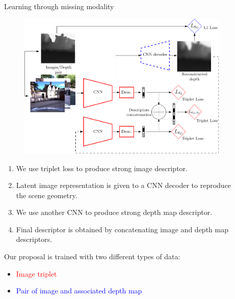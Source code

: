 \documentclass[final]{beamer}
\newlength{\sepwidth}
\newlength{\colwidth}
\newcommand{\separatorcolumn}{\begin{column}{\sepwidth}\end{column}}
\begin{document}
\begin{frame}[t]
\begin{columns}[t]
\begin{column}{\colwidth}
\end{column}

\separatorcolumn

\begin{column}{\colwidth}  

  \begin{block}{Learning through missing modality}
    \begin{figure}
		\centering
		\includegraphics[width=\linewidth]{vect/method/fig3/final_color}	    
    \end{figure}
    
    \begin{enumerate}
      \item We use triplet loss to produce strong image descriptor.
      \item Latent image representation is given to a CNN decoder to reproduce the scene geometry.
      \item We use another CNN to produce strong depth map descriptor.
      \item Final descriptor is obtained by concatenating image and depth map descriptors.
    \end{enumerate}        
    
    Our proposal is trained with two different types of data:
    \begin{itemize}
    	\item \textcolor{red}{Image triplet}
    	\item \textcolor{blue}{Pair of image and associated depth map}
    \end{itemize}
  \end{block}


\end{column}
\end{columns}
\end{frame}
\end{document}
